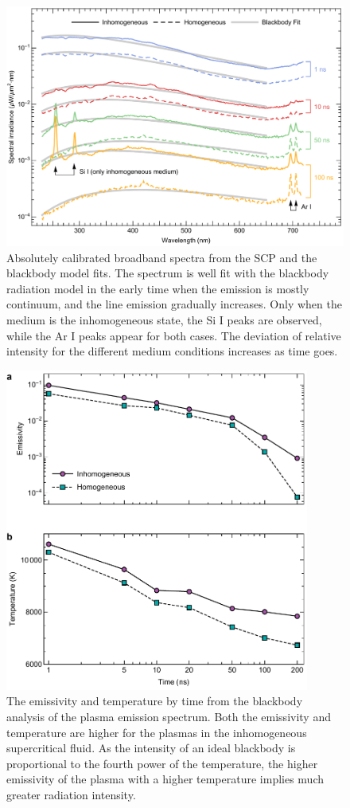 \begin{figure}[ht!]
\centering
\includegraphics[width=130mm]{figures/ch4/blackbody/fit.pdf}
\caption{Absolutely calibrated broadband spectra from the SCP and the blackbody model fits. The spectrum is well fit with the blackbody radiation model in the early time when the emission is mostly continuum, and the line emission gradually increases. Only when the medium is the inhomogeneous state, the Si I peaks are observed, while the Ar I peaks appear for both cases. The deviation of relative intensity for the different medium conditions increases as time goes.}
\label{fig:blackbodyFit}
\end{figure}

\begin{figure}[ht!]
\centering
\includegraphics[width=100mm]{figures/ch4/blackbody/temporal.pdf}
\caption{The emissivity and temperature by time from the blackbody analysis of the plasma emission spectrum. Both the emissivity and temperature are higher for the plasmas in the inhomogeneous supercritical fluid. As the intensity of an ideal blackbody is proportional to the fourth power of the temperature, the higher emissivity of the plasma with a higher temperature implies much greater radiation intensity.}
\label{fig:blackbodyTemporal}
\end{figure}

